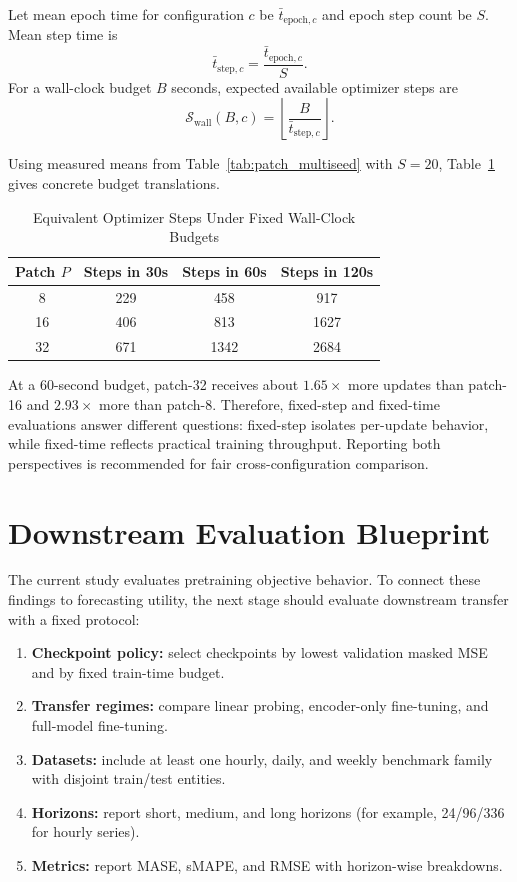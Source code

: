 \documentclass[conference]{IEEEtran}
\begin{document}
Let mean epoch time for configuration $c$ be $\bar{t}_{\text{epoch},c}$ and epoch step count be $S$. Mean step time is
\begin{equation}
\bar{t}_{\text{step},c} = \frac{\bar{t}_{\text{epoch},c}}{S}.
\label{eq:step_time}
\end{equation}
For a wall-clock budget $B$ seconds, expected available optimizer steps are
\begin{equation}
\mathcal{S}_{\text{wall}}(B,c) = \left\lfloor\frac{B}{\bar{t}_{\text{step},c}}\right\rfloor.
\label{eq:wall_steps}
\end{equation}

Using measured means from Table~\ref{tab:patch_multiseed} with $S=20$, Table~\ref{tab:wallclock_steps} gives concrete budget translations.

\begin{table}[t]
\caption{Equivalent Optimizer Steps Under Fixed Wall-Clock Budgets}
\label{tab:wallclock_steps}
\centering
\begin{tabular}{cccc}
\toprule
Patch $P$ & Steps in 30s & Steps in 60s & Steps in 120s \\
\midrule
8  & 229 & 458  & 917  \\
16 & 406 & 813  & 1627 \\
32 & 671 & 1342 & 2684 \\
\bottomrule
\end{tabular}
\end{table}

At a 60-second budget, patch-32 receives about $1.65\times$ more updates than patch-16 and $2.93\times$ more than patch-8. Therefore, fixed-step and fixed-time evaluations answer different questions: fixed-step isolates per-update behavior, while fixed-time reflects practical training throughput. Reporting both perspectives is recommended for fair cross-configuration comparison.

\section{Downstream Evaluation Blueprint}
The current study evaluates pretraining objective behavior. To connect these findings to forecasting utility, the next stage should evaluate downstream transfer with a fixed protocol:
\begin{enumerate}
    \item \textbf{Checkpoint policy:} select checkpoints by lowest validation masked MSE and by fixed train-time budget.
    \item \textbf{Transfer regimes:} compare linear probing, encoder-only fine-tuning, and full-model fine-tuning.
    \item \textbf{Datasets:} include at least one hourly, daily, and weekly benchmark family with disjoint train/test entities.
    \item \textbf{Horizons:} report short, medium, and long horizons (for example, 24/96/336 for hourly series).
    \item \textbf{Metrics:} report MASE, sMAPE, and RMSE with horizon-wise breakdowns.
\end{enumerate}
\end{document}
